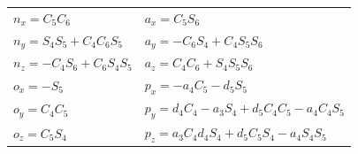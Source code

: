 \begin{minipage}{0.9\textwidth}
\begin{tabular}{l l}


$n_x=C_5 C_6$ 				& \hspace{2cm} $a_x=C_5 S_6$\\
$n_y=S_4 S_5 +  C_4 C_6 S_5$	& \hspace{2cm} $a_y=-C_6 S_4 + C_4 S_5 S_6$\\
$n_z=-C_4 S_6 + C_6 S_4 S_5$ & \hspace{2cm} $a_z=C_4 C_6 + S_4 S_5 S_6$\\
$o_x=-S_5$ 					& \hspace{2cm} $p_x=-a_4 C_5 -d_5 S_5$\\
$o_y=C_4 C_5$ 				& \hspace{2cm} $p_y=d_4 C_4 -a_3 S_4 + d_5 C_4 C_5 -a_4 C_4 S_5$\\
$o_z=C_5 S_4$ 				& \hspace{2cm} $p_z=a_3 C_4 d_4 S_4  + d_5 C_5 S_4 -a_4 S_4 S_5$\\
\end{tabular}
\end{minipage}








